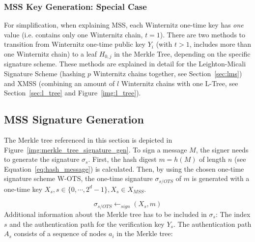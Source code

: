 \subsubsection{MSS Key Generation: Special Case}
\label{sec:mss_special_keygen}
For simplification, when explaining MSS, each Winternitz one-time key has \textit{one} value (i.e. contains only one Winternitz chain, $t = 1$). There are two methods to transition from Winternitz one-time public key $Y_i$ (with $t > 1$, includes more than one Winternitz chain) to a leaf $H_{0,j}$ in the Merkle Tree, depending on the specific signature scheme. 
These methods are explained in detail for the Leighton-Micali Signature Scheme (hashing $p$ Winternitz chains together, see Section~\ref{sec:lms}) and XMSS (combining an amount of $l$ Winternitz chains with one L-Tree, see Section~\ref{sec:l_tree} and Figure~\ref{img:l_tree}). 

\subsection{MSS Signature Generation}
\label{sec:mss_sig_gen}
The Merkle tree referenced in this section is depicted in Figure~\ref{img:merkle_tree_signature_gen}. 
To sign a message $M$, the signer needs to generate the signature $\sigma_s$.
First, the hash digest $m = h(M)$ of length $n$ (see Equation~\ref{eq:hash_message}) is calculated. Then, by using the chosen one-time signature scheme W-OTS, the one-time signature $\sigma_{s/OTS}$ of $m$ is generated with a one-time key $X_s, s \in \{0, \cdots, 2^d - 1\}, X_s \in X_{MSS}$. %

\begin{equation}
\label{eq:merkle_s/OTS_signature}
\sigma_{s/OTS} \leftarrow_{sign} (X_s, m) 
\end{equation}
Additional information about the Merkle tree has to be included in $\sigma_s$: The index $s$ and the authentication path for the verification key $Y_s$. The authentication path $A_s$ consists of a sequence of nodes $a_i$ in the Merkle tree:

